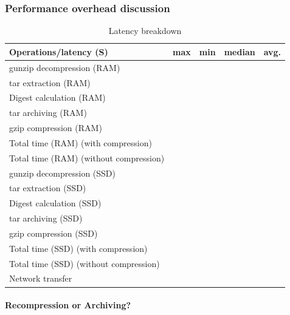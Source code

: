 \subsubsection{Performance overhead discussion}

\begin{table} 
	\centering 
	\scriptsize  
	\caption{Latency breakdown} \label{tbl:redundant_ratio} 
	\begin{tabular}{|l|l|l|l|l|}%
		\hline 
		Operations/latency (S) & max & min & median & avg.\\
		\hline
		 gunzip decompression (RAM) &   &   &    &  \\
 		\hline
 		tar extraction (RAM) &   &   &    &  \\
		\hline
		Digest calculation (RAM) &  &  & & \\
		\hline
		tar archiving (RAM)  &  &  & &\\
		\hline
		gzip compression (RAM) & &  &  & \\
		\hline
		Total time (RAM) (with compression) & & & & \\
		\hline
		Total time (RAM) (without compression) & & & & \\
		\hline
 		\hline
 		gunzip decompression (SSD) &   &   &    &  \\
 		\hline
 		tar extraction (SSD) &   &   &    &  \\
		\hline
		Digest calculation (SSD) &  &  & & \\
		\hline
		tar archiving (SSD) &  &  & & \\
		\hline
		gzip compression (SSD) & &  &  & \\
		\hline		 
		Total time (SSD) (with compression) & & & & \\
		\hline
		Total time (SSD) (without compression) & & & & \\
		\hline
		\hline
		Network transfer & & & & \\
		\hline 	
	\end{tabular} 
\end{table} 

\paragraph{Recompression or Archiving?} 

